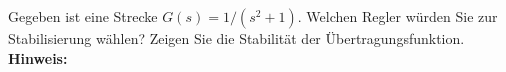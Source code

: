 \begin{question}[section=4,name={Stabilisierung},difficulty=,type=mdl,tags={}]
	Gegeben ist eine Strecke $G(s) = 1/(s^2 + 1)$. Welchen Regler würden Sie zur Stabilisierung wählen? Zeigen Sie die Stabilität der Übertragungsfunktion.
	\\ \textbf{Hinweis:}\\
	
\end{question}
\begin{solution}
	
\end{solution}